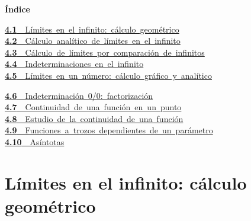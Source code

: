 \documentclass[11pt,a4paper]{article}
\begin{document}
\begin{tcolorbox}[colback=fmsurface,colframe=fmsurface,arc=3mm,left=4mm,right=4mm,top=2mm,bottom=2mm]
\small\textbf{Índice}\par\smallskip
\begin{minipage}[t]{0.49\linewidth}\small \mbox{\hyperlink{sec1}{\textbf{\color{fmgreen}4.1}\ \ Límites en el infinito: cálculo geométrico}}\\[3pt]
\mbox{\hyperlink{sec2}{\textbf{\color{fmgreen}4.2}\ \ Cálculo analítico de límites en el infinito}}\\[3pt]
\mbox{\hyperlink{sec3}{\textbf{\color{fmgreen}4.3}\ \ Cálculo de límites por comparación de infinitos}}\\[3pt]
\mbox{\hyperlink{sec4}{\textbf{\color{fmgreen}4.4}\ \ Indeterminaciones en el infinito}}\\[3pt]
\mbox{\hyperlink{sec5}{\textbf{\color{fmgreen}4.5}\ \ Límites en un número: cálculo gráfico y analítico}}\\[3pt]\end{minipage}\hfill\begin{minipage}[t]{0.49\linewidth}\small \mbox{\hyperlink{sec6}{\textbf{\color{fmgreen}4.6}\ \ Indeterminación 0/0: factorización}}\\[3pt]
\mbox{\hyperlink{sec7}{\textbf{\color{fmgreen}4.7}\ \ Continuidad de una función en un punto}}\\[3pt]
\mbox{\hyperlink{sec8}{\textbf{\color{fmgreen}4.8}\ \ Estudio de la continuidad de una función}}\\[3pt]
\mbox{\hyperlink{sec9}{\textbf{\color{fmgreen}4.9}\ \ Funciones a trozos dependientes de un parámetro}}\\[3pt]
\mbox{\hyperlink{sec10}{\textbf{\color{fmgreen}4.10}\ \ Asíntotas}}\\[3pt]\end{minipage}
\end{tcolorbox}

\section{Límites en el infinito: cálculo geométrico}\hypertarget{sec1}{}

  
\end{document}
